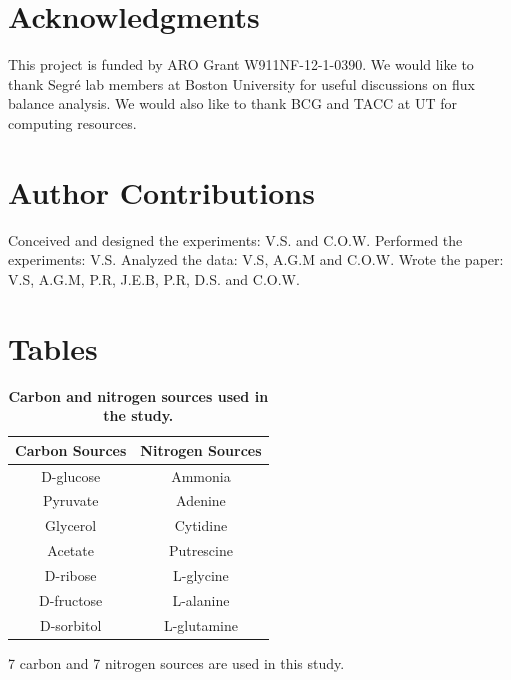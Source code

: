 \documentclass[12pt]{article}
\begin{document}
\section*{Acknowledgments}
This project is funded by ARO Grant W911NF-12-1-0390. We would like to thank Segr\'e lab members at Boston University for useful discussions on flux balance analysis. We would also like to thank BCG and TACC at UT for computing resources. 

\section*{Author Contributions}
Conceived and designed the experiments: V.S. and C.O.W. Performed the experiments: V.S. Analyzed the data: V.S, A.G.M and C.O.W. Wrote the paper: V.S, A.G.M, P.R, J.E.B, P.R, D.S. and C.O.W.



\newpage
\section*{Tables}
\begin{table}[!ht]
\caption{
\bf{Carbon and nitrogen sources used in the study.}}
\begin{tabular}{|c|c|}
\hline \hline
Carbon Sources & Nitrogen Sources \\
\hline
D-glucose & Ammonia \\
Pyruvate & Adenine \\
Glycerol & Cytidine \\
Acetate & Putrescine \\
D-ribose & L-glycine \\
D-fructose & L-alanine \\
D-sorbitol & L-glutamine \\
\hline
\end{tabular}
\begin{flushleft} 7 carbon and 7 nitrogen sources are used in this study.
\end{flushleft}
\label{tab:label}
 \end{table}
\end{document}
